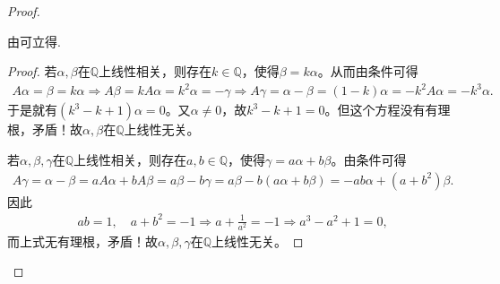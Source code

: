 \documentclass[../../main.tex]{subfiles}
\begin{document}
\begin{proof}
\begin{example}
\end{example}
\begin{note}
由可立得.
\end{note}
\begin{proof}
若$\alpha, \beta$在$\mathbb{Q}$上线性相关，则存在$k\in \mathbb{Q}$，使得$\beta =k\alpha$。从而由条件可得
\begin{align*}
A\alpha =\beta =k\alpha \Longrightarrow A\beta =kA\alpha =k^2\alpha =-\gamma 
\Longrightarrow A\gamma =\alpha -\beta =\left( 1-k \right) \alpha =-k^2A\alpha =-k^3\alpha .
\end{align*}
于是就有$\left( k^3-k+1 \right) \alpha =0$。又$\alpha \ne 0$，故$k^3-k+1=0$。但这个方程没有有理根，矛盾！故$\alpha, \beta$在$\mathbb{Q}$上线性无关。

若$\alpha, \beta, \gamma$在$\mathbb{Q}$上线性相关，则存在$a,b\in \mathbb{Q}$，使得$\gamma =a\alpha +b\beta$。由条件可得
\begin{align*}
A\gamma =\alpha -\beta =aA\alpha +bA\beta =a\beta -b\gamma =a\beta -b\left( a\alpha +b\beta \right) =-ab\alpha +\left( a+b^2 \right) \beta .
\end{align*}
因此
\begin{align*}
ab=1,\quad a+b^2=-1\Longrightarrow a+\frac{1}{a^2}=-1\Longrightarrow a^3-a^2+1=0,
\end{align*}
而上式无有理根，矛盾！故$\alpha, \beta, \gamma$在$\mathbb{Q}$上线性无关。

\end{proof}


\end{proof}
\end{document}
